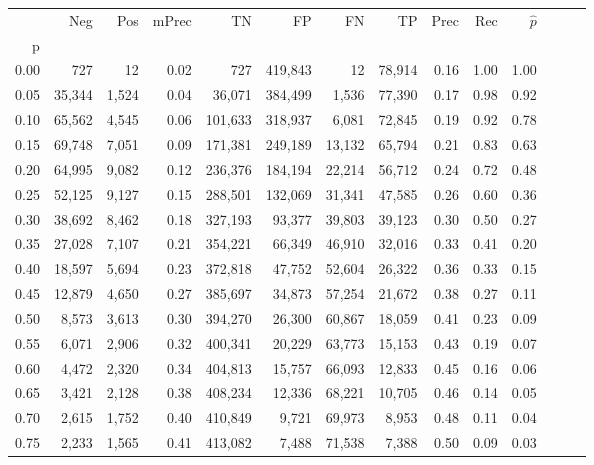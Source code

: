 \begin{tabular}{rrrrrrrrrrrrrr}
\toprule
{} &     Neg &    Pos & mPrec &       TN &       FP &      FN &      TP &  Prec &   Rec & $\hat{p}$ \\
p    &         &        &       &          &          &         &         &       &       &           \\
\midrule
0.00 &     727 &     12 &  0.02 &      727 &  419,843 &      12 &  78,914 &  0.16 &  1.00 &      1.00 \\
0.05 &  35,344 &  1,524 &  0.04 &   36,071 &  384,499 &   1,536 &  77,390 &  0.17 &  0.98 &      0.92 \\
0.10 &  65,562 &  4,545 &  0.06 &  101,633 &  318,937 &   6,081 &  72,845 &  0.19 &  0.92 &      0.78 \\
0.15 &  69,748 &  7,051 &  0.09 &  171,381 &  249,189 &  13,132 &  65,794 &  0.21 &  0.83 &      0.63 \\
0.20 &  64,995 &  9,082 &  0.12 &  236,376 &  184,194 &  22,214 &  56,712 &  0.24 &  0.72 &      0.48 \\
0.25 &  52,125 &  9,127 &  0.15 &  288,501 &  132,069 &  31,341 &  47,585 &  0.26 &  0.60 &      0.36 \\
0.30 &  38,692 &  8,462 &  0.18 &  327,193 &   93,377 &  39,803 &  39,123 &  0.30 &  0.50 &      0.27 \\
0.35 &  27,028 &  7,107 &  0.21 &  354,221 &   66,349 &  46,910 &  32,016 &  0.33 &  0.41 &      0.20 \\
0.40 &  18,597 &  5,694 &  0.23 &  372,818 &   47,752 &  52,604 &  26,322 &  0.36 &  0.33 &      0.15 \\
0.45 &  12,879 &  4,650 &  0.27 &  385,697 &   34,873 &  57,254 &  21,672 &  0.38 &  0.27 &      0.11 \\
0.50 &   8,573 &  3,613 &  0.30 &  394,270 &   26,300 &  60,867 &  18,059 &  0.41 &  0.23 &      0.09 \\
0.55 &   6,071 &  2,906 &  0.32 &  400,341 &   20,229 &  63,773 &  15,153 &  0.43 &  0.19 &      0.07 \\
0.60 &   4,472 &  2,320 &  0.34 &  404,813 &   15,757 &  66,093 &  12,833 &  0.45 &  0.16 &      0.06 \\
0.65 &   3,421 &  2,128 &  0.38 &  408,234 &   12,336 &  68,221 &  10,705 &  0.46 &  0.14 &      0.05 \\
0.70 &   2,615 &  1,752 &  0.40 &  410,849 &    9,721 &  69,973 &   8,953 &  0.48 &  0.11 &      0.04 \\
0.75 &   2,233 &  1,565 &  0.41 &  413,082 &    7,488 &  71,538 &   7,388 &  0.50 &  0.09 &      0.03 \\

\end{tabular}
